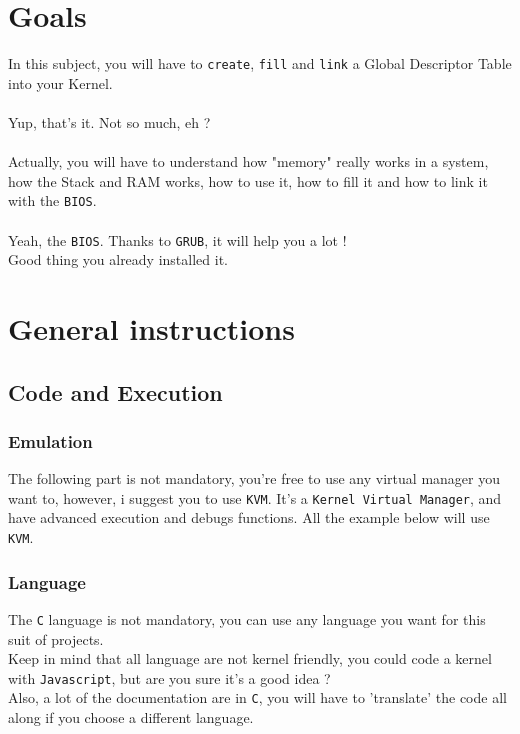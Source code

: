 \documentclass{42-en}
\begin{document}
\chapter{Goals}


	In this subject, you will have to \texttt{create}, \texttt{fill} and \texttt{link}
	a Global Descriptor Table into your Kernel.\\
	\\
	Yup, that's it. Not so much, eh ?\\
	\\
	Actually, you will have to understand how "memory" really works in a system,
	how the Stack and RAM works, how to use it, how to fill it and how to link it
	with the \texttt{BIOS}.\\
	\\
	Yeah, the \texttt{BIOS}. Thanks to \texttt{GRUB}, it will help you a lot !\\
	Good thing you already installed it.

\newpage
\chapter{General instructions}
	\section{Code and Execution}
		\subsection{Emulation}
		The following part is not mandatory, you're free to use any virtual
		manager you want to, however, i suggest you to use \texttt{KVM}.
		It's a \texttt{Kernel Virtual Manager}, and have advanced execution
		and debugs functions.
		All the example below will use \texttt{KVM}.
		\subsection{Language}
			The \texttt{C} language is not mandatory, you can use any language
			you want for this suit of projects.\\
			Keep in mind that all language are not kernel friendly, you could
			code a kernel with \texttt{Javascript}, but are you sure
			it's a good idea ?\\ Also, a lot of the documentation are
			in \texttt{C}, you will have to 'translate' the code all along
			if you choose a different language.\\
\end{document}
